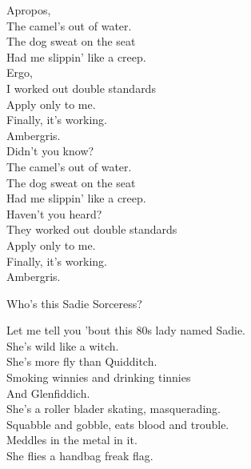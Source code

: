 Apropos, \\
The camel's out of water. \\
The dog sweat on the seat \\
Had me slippin' like a creep. \\

Ergo, \\
I worked out double standards \\
Apply only to me. \\
Finally, it's working. \\
Ambergris. \\

Didn't you know? \\
The camel's out of water. \\
The dog sweat on the seat \\
Had me slippin' like a creep. \\

Haven't you heard? \\
They worked out double standards \\
Apply only to me. \\
Finally, it's working. \\
Ambergris. \\





Who's this Sadie Sorceress? \\


Let me tell you 'bout this 80s lady named Sadie. \\

She's wild like a witch. \\
She's more fly than Quidditch. \\
Smoking winnies and drinking tinnies \\
And Glenfiddich. \\
She's a roller blader skating, masquerading. \\
Squabble and gobble, eats blood and trouble. \\
Meddles in the metal in it. \\
She flies a handbag freak flag. \\

